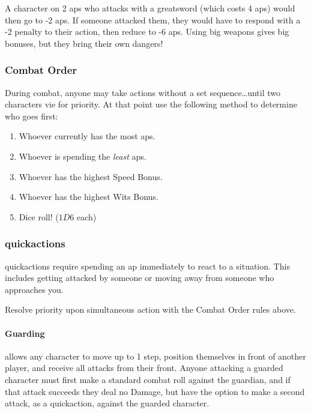 \begin{multicols}{2}
\begin{exampletext}
  A character on 2 \glspl{ap} who attacks with a greatsword (which costs 4 \glspl{ap}) would then go to -2 \glspl{ap}.
  If someone attacked them, they would have to respond with a -2 penalty to their action, then reduce to -6 \glspl{ap}.
  Using big weapons gives big bonuses, but they bring their own dangers!
\end{exampletext}

\subsubsection{Combat Order}

﻿During combat, anyone may take actions without a set sequence\ldots until two characters vie for priority.
At that point use the following method to determine who goes first:

\begin{enumerate}
  \item
  Whoever currently has the most \glspl{ap}.
  \item
  Whoever is spending the \emph{least} \glspl{ap}.
  \item
  Whoever has the highest Speed Bonus.
  \item
  Whoever has the highest Wits Bonus.
  \item
  Dice roll! ($1D6$ each)
\end{enumerate}

\subsubsection{\Glspl{quickaction}}

\Glspl{quickaction} require spending an \gls{ap} immediately to react to a situation.
This includes getting attacked by someone or moving away from someone who approaches you.

Resolve priority upon simultaneous action with the Combat Order rules above.

\paragraph{Guarding}
\label{guarding}
allows any character to move up to 1 \gls{step}, position themselves in front of another player, and receive all attacks from their front.
Anyone attacking a guarded character must first make a standard combat roll against the guardian, and if that attack succeeds they deal no Damage, but have the option to make a second attack, as a \gls{quickaction}, against the guarded character.


\end{multicols}
